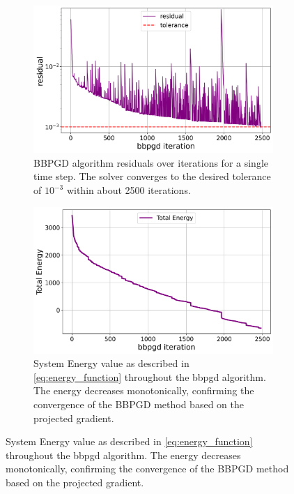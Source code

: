 \documentclass[conference]{IEEEtran}
\begin{document}
\begin{figure}[H]
    \centering
    \begin{subfigure}[b]{\linewidth}
        \centering
        \includegraphics[width=\linewidth]{figures/comparison_plots/bbpgd_residual.png}
        \caption{BBPGD algorithm residuals over iterations for a single time step. The solver converges to the desired tolerance of $10^{-3}$ within about 2500 iterations.}
        \label{fig:bbpgd_residual}
    \end{subfigure}

    \vspace{1em}

    \begin{subfigure}[b]{\linewidth}
        \centering
        \includegraphics[width=\linewidth]{figures/comparison_plots/bbpgd_total_energy.png}
        \caption{System Energy value as described in \autoref{eq:energy_function} throughout the bbpgd algorithm. The energy decreases monotonically, confirming the convergence of the BBPGD method based on the projected gradient.}
        \label{fig:bbpgd_energy}
    \end{subfigure}


\end{figure}
\end{document}
